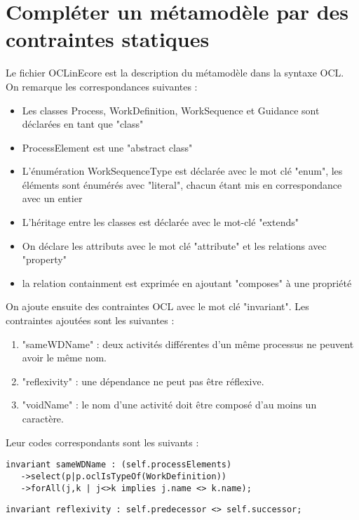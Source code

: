 \section{Compléter un métamodèle par des contraintes statiques}

Le fichier OCLinEcore est la description du métamodèle dans la syntaxe OCL. On remarque les correspondances suivantes :
\begin{itemize}
   \item Les classes Process, WorkDefinition, WorkSequence et Guidance sont déclarées en tant que "class"
   \item ProcessElement est une "abstract class"
   \item L'énumération WorkSequenceType est déclarée avec le mot clé "enum", les éléments sont énumérés avec "literal", chacun étant mis en correspondance avec un entier
   \item L'héritage entre les classes est déclarée avec le mot-clé "extends"
   \item On déclare les attributs avec le mot clé "attribute" et les relations avec "property"
   \item la relation containment est exprimée en ajoutant "composes" à une propriété
\end{itemize}

\vspace{1em}
On ajoute ensuite des contraintes OCL avec le mot clé "invariant". Les contraintes ajoutées sont les suivantes :
\begin{enumerate}
   \item "sameWDName" : deux activités différentes d'un même processus ne peuvent avoir le même nom.
   \item "reflexivity" : une dépendance ne peut pas être réflexive.
   \item "voidName" : le nom d'une activité doit être composé d'au moins un caractère.
\end{enumerate}

\vspace{1em}
Leur codes correspondants sont les suivants :
\begin{lstlisting}[caption="sameWDName" in Process class]
invariant sameWDName : (self.processElements)
   ->select(p|p.oclIsTypeOf(WorkDefinition))
   ->forAll(j,k | j<>k implies j.name <> k.name);
\end{lstlisting}

\begin{lstlisting}[caption="reflexivity" in WorkSequence class]
invariant reflexivity : self.predecessor <> self.successor;
\end{lstlisting}

